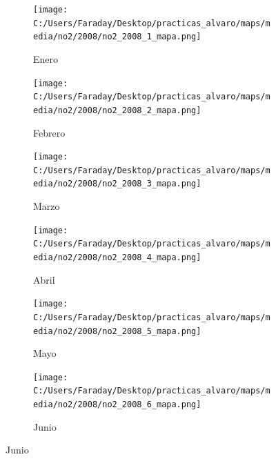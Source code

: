 \documentclass[12pt]{article}
\begin{document}
\begin{figure}[H]
\centering
\begin{subfigure}[H]{0.15\textwidth}
\texttt{[image: C:/Users/Faraday/Desktop/practicas\_alvaro/maps/media/no2/2008/no2\_2008\_1\_mapa.png]}
\captionsetup{labelformat=empty}
\caption{Enero}
\label{fig:map-no2-2008-1}
\end{subfigure}
%
\begin{subfigure}[H]{0.15\textwidth}
\texttt{[image: C:/Users/Faraday/Desktop/practicas\_alvaro/maps/media/no2/2008/no2\_2008\_2\_mapa.png]}
\captionsetup{labelformat=empty}
\caption{Febrero}
\label{fig:map-no2-2008-2}
\end{subfigure}
%
\begin{subfigure}[H]{0.15\textwidth}
\texttt{[image: C:/Users/Faraday/Desktop/practicas\_alvaro/maps/media/no2/2008/no2\_2008\_3\_mapa.png]}
\captionsetup{labelformat=empty}
\caption{Marzo}
\label{fig:map-no2-2008-3}
\end{subfigure}
%
\begin{subfigure}[H]{0.15\textwidth}
\texttt{[image: C:/Users/Faraday/Desktop/practicas\_alvaro/maps/media/no2/2008/no2\_2008\_4\_mapa.png]}
\captionsetup{labelformat=empty}
\caption{Abril}
\label{fig:map-no2-2008-4}
\end{subfigure}
%
\begin{subfigure}[H]{0.15\textwidth}
\texttt{[image: C:/Users/Faraday/Desktop/practicas\_alvaro/maps/media/no2/2008/no2\_2008\_5\_mapa.png]}
\captionsetup{labelformat=empty}
\caption{Mayo}
\label{fig:map-no2-2008-5}
\end{subfigure}
%
\begin{subfigure}[H]{0.15\textwidth}
\texttt{[image: C:/Users/Faraday/Desktop/practicas\_alvaro/maps/media/no2/2008/no2\_2008\_6\_mapa.png]}
\captionsetup{labelformat=empty}
\caption{Junio}
\label{fig:map-no2-2008-6}
\end{subfigure}


\end{figure}
\end{document}
